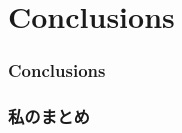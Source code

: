 \section{Conclusions}


\begin{frame}\frametitle{Conclusions}
\end{frame}


\begin{frame}\frametitle{私のまとめ}
\end{frame}
